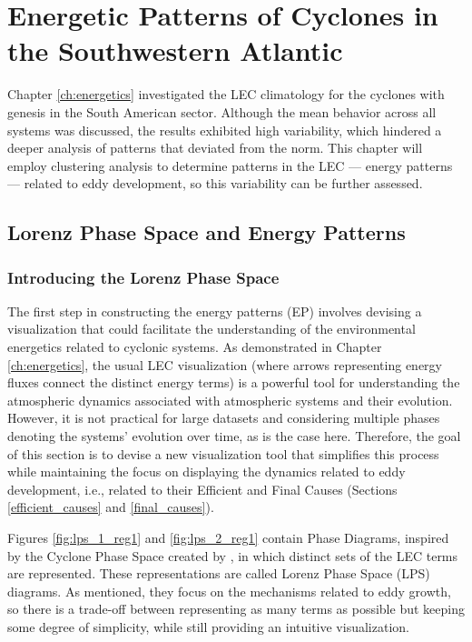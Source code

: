 \chapter{Energetic Patterns of Cyclones in the Southwestern Atlantic}\label{ch:energetic_patterns}


Chapter \ref{ch:energetics} investigated the LEC climatology for the cyclones with genesis in the South American sector. Although the mean behavior across all systems was discussed, the results exhibited high variability, which hindered a deeper analysis of patterns that deviated from the norm. This chapter will employ clustering analysis to determine patterns in the LEC — energy patterns — related to eddy development, so this variability can be further assessed. 

\section{Lorenz Phase Space and Energy Patterns}\label{sec:lps}

\subsection{Introducing the Lorenz Phase Space}

The first step in constructing the energy patterns (EP) involves devising a visualization that could facilitate the understanding of the environmental energetics related to cyclonic systems. As demonstrated in Chapter \ref{ch:energetics}, the usual LEC visualization (where arrows representing energy fluxes connect the distinct energy terms) is a powerful tool for understanding the atmospheric dynamics associated with atmospheric systems and their evolution. However, it is not practical for large datasets and considering multiple phases denoting the systems' evolution over time, as is the case here. Therefore, the goal of this section is to devise a new visualization tool that simplifies this process while maintaining the focus on displaying the dynamics related to eddy development, i.e., related to their Efficient and Final Causes (Sections \ref{efficient_causes} and \ref{final_causes}).

Figures \ref{fig:lps_1_reg1} and \ref{fig:lps_2_reg1} contain Phase Diagrams, inspired by the Cyclone Phase Space created by \citet{hart2003cyclone}, in which distinct sets of the LEC terms are represented. These representations are called Lorenz Phase Space (LPS) diagrams. As mentioned, they focus on the mechanisms related to eddy growth, so there is a trade-off between representing as many terms as possible but keeping some degree of simplicity, while still providing an intuitive visualization.

